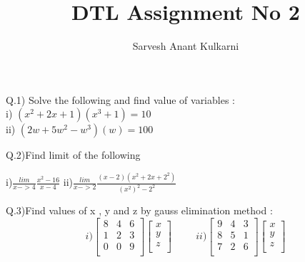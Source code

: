 \documentclass[16pt]{article}
\title{DTL Assignment No 2 }
\author{Sarvesh Anant Kulkarni}
\begin{document}
\maketitle

\large
{}
\begin{flushleft}
Q.1) Solve the following and find value of variables : \\[10pt]
 i) $(x^2 + 2x + 1 )(x^3 + 1)=10$\hspace{5cm} \\[6 pt]
 ii) $(2w + 5w^2 - w^3) (w)=100$\hspace{4.85cm} \\
\end{flushleft}



\begin{flushleft}
Q.2)Find limit of the following \hspace{1cm} \\[10pt]
\begin{LARGE}
i)$\frac{lim}{x -> 4}  \frac{x^2 - 16}{x-4}$ \hspace{0.1cm}
ii)$\frac{lim}{x -> 2}  \frac{(x-2)(x^2+2x+2^2)}{(x^2)^2 - 2^2}$
\end{LARGE}
\end{flushleft}

\begin{flushleft}
Q.3)Find values of x , y and z by gauss elimination method :\\[10pt]

\[i)
\begin{bmatrix}
8 & 4 & 6 \\
1 & 2 & 3 \\
0 & 0 & 9 \\
\end{bmatrix}
\begin{bmatrix}
x\\
y\\
z\\
\end{bmatrix}
\hspace{1cm}
ii)
\begin{bmatrix}
9 & 4 & 3 \\
8 & 5 & 1 \\
7 & 2 & 6 \\
\end{bmatrix}
\begin{bmatrix}
x\\
y\\
z\\
\end{bmatrix}
\]
\end{flushleft}
\end{document}
